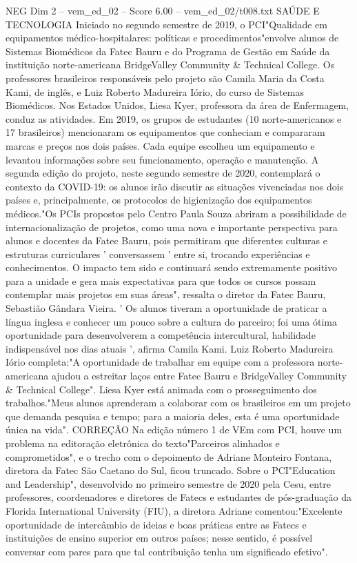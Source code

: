 \begin{textsample}{NEG Dim 2 – vem\_ed\_02 – Score 6.00 – vem\_ed\_02/t008.txt}  \label{ex:f2_neg_121}
SAÚDE E TECNOLOGIA Iniciado no segundo semestre de 2019, o PCI"Qualidade em equipamentos médico-hospitalares: políticas e procedimentos"envolve alunos de Sistemas Biomédicos da Fatec Bauru e do Programa de Gestão em Saúde da instituição norte-americana BridgeValley Community \& Technical College.
Os professores brasileiros responsáveis pelo projeto são Camila Maria da Costa Kami, de inglês, e Luiz Roberto Madureira Iório, do curso de Sistemas Biomédicos.
Nos Estados Unidos, Liesa Kyer, professora da área de Enfermagem, conduz as atividades.
Em 2019, os grupos de estudantes (10 norte-americanos e 17 brasileiros) mencionaram os equipamentos que conheciam e compararam marcas e preços nos dois países.
Cada equipe escolheu um equipamento e levantou informações sobre seu funcionamento, operação e manutenção.
A segunda edição do projeto, neste segundo semestre de 2020, contemplará o contexto da COVID-19: os alunos irão discutir as situações vivenciadas nos dois países e, principalmente, os protocolos de higienização dos equipamentos médicos."Os PCIs propostos pelo Centro Paula Souza abriram a possibilidade de internacionalização de projetos, como uma nova e importante perspectiva para alunos e docentes da Fatec Bauru, pois permitiram que diferentes culturas e estruturas curriculares ' conversassem ' entre si, trocando experiências e conhecimentos.
O impacto tem sido e continuará sendo extremamente positivo para a unidade e gera mais expectativas para que todos os cursos possam contemplar mais projetos em suas áreas", ressalta o diretor da Fatec Bauru, Sebastião Gândara Vieira. ' Os alunos tiveram a oportunidade de praticar a língua inglesa e conhecer um pouco sobre a cultura do parceiro; foi uma ótima oportunidade para desenvolverem a competência intercultural, habilidade indispensável nos dias atuais ', afirma Camila Kami.
Luiz Roberto Madureira Iório completa:"A oportunidade de trabalhar em equipe com a professora norte-americana ajudou a estreitar laços entre Fatec Bauru e BridgeValley Community \& Technical College".
Liesa Kyer está animada com o prosseguimento dos trabalhos."Meus alunos aprenderam a colaborar com os brasileiros em um projeto que demanda pesquisa e tempo; para a maioria deles, esta é uma oportunidade única na vida".
CORREÇÃO Na edição número 1 de VEm com PCI, houve um problema na editoração eletrônica do texto"Parceiros alinhados e comprometidos", e o trecho com o depoimento de Adriane Monteiro Fontana, diretora da Fatec São Caetano do Sul, ficou truncado.
Sobre o PCI"Education and Leadership", desenvolvido no primeiro semestre de 2020 pela Cesu, entre professores, coordenadores e diretores de Fatecs e estudantes de pós-graduação da Florida International University (FIU), a diretora Adriane comentou:"Excelente oportunidade de intercâmbio de ideias e boas práticas entre as Fatecs e instituições de ensino superior em outros países; nesse sentido, é possível conversar com pares para que tal contribuição tenha um significado efetivo".

\end{textsample}

